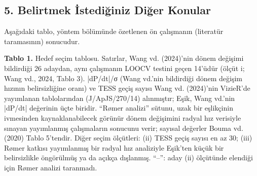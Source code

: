 \subsection*{5. Belirtmek İstediğiniz Diğer Konular}
Aşağıdaki tablo, yöntem bölümünde özetlenen ön çalışmanın (literatür taramasının) sonucudur.

\textbf{Tablo 1.} Hedef seçim tablosu. Satırlar, Wang vd. (2024)'nin dönem değişimi bildirdiği 26 adaydan, aynı çalışmanın LOOCV testini geçen 14'üdür (ölçüt i; Wang vd., 2024, Tablo 3). |dP/dt|/σ (Wang vd.'nin bildirdiği dönem değişim hızının belirsizliğine oranı) ve TESS geçiş sayısı Wang vd. (2024)'nin VizieR'de yayımlanan tablolarından (J/ApJS/270/14) alınmıştır; Eşik, Wang vd.'nin |dP/dt| değerinin üçte biridir. “Rømer analizi” sütunu, uzak bir eşlikçinin ivmesinden kaynaklanabilecek görünür dönem değişimini radyal hız verisiyle sınayan yayımlanmış çalışmaların sonucunu verir; sayısal değerler Bouma vd. (2020) Tablo 5'tendir. Diğer seçim ölçütleri: (ii) TESS geçiş sayısı en az 30; (iii) Rømer katkısı yayımlanmış bir radyal hız analiziyle Eşik'ten küçük bir belirsizlikle öngörülmüş ya da açıkça dışlanmış. “–”: aday (ii) ölçütünde elendiği için Rømer analizi taranmadı.

